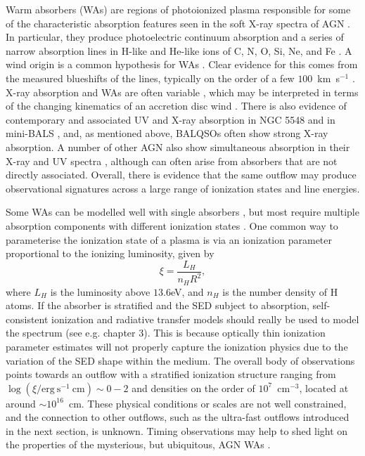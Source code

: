 Warm absorbers (WAs) are regions of photoionized plasma responsible for some
of the characteristic absorption features seen in the 
soft X-ray spectra of AGN \citep{reynolds1995}.
In particular, they produce photoelectric continuum absorption 
\citep[e.g.][]{halpern1984,cappi1996,kriss1996}
and a series of narrow absorption lines in H-like and He-like ions of 
C, N, O, Si, Ne, and Fe \citep{kaastra2000}.
A wind origin is a common hypothesis for WAs 
\citep[e.g.][]{krolikkriss2001}. Clear evidence for this 
comes from the measured blueshifts of the lines, typically on the order of 
a few $100$~km~s$^{-1}$ \citep[e.g.][]{kaastra2000}. X-ray absorption and WAs are often
variable \citep{fabian1994,otani1996}, which may be interpreted in terms of 
the changing kinematics of an accretion disc wind \citep{connolly2014}. 
There is also evidence of contemporary and associated UV and X-ray absorption 
in NGC 5548 \citep{kaastra2014} and in mini-BALS \citep{giustini2011},
and, as mentioned above, BALQSOs often show strong X-ray absorption. 
A number of other AGN also show simultaneous absorption in their X-ray 
and UV spectra \citep[e.g.][]{crenshaw2003,crenshaw2012}, 
although can often arise from absorbers that are not directly associated.
Overall, there is evidence that the same outflow may produce observational signatures  
across a large range of ionization states and line energies. 

Some WAs can be modelled well with single absorbers \citep{kaastra2000}, 
but most require multiple absorption components with different ionization states
\citep[e.g.][]{kriss1996,orr1997,krolikkriss2001,connolly2014}.
One common way to parameterise the ionization state of a plasma is 
via an ionization parameter proportional to the ionizing luminosity, 
given by \citep[e.g.][]{reynolds1995}
\begin{equation}
\xi = \frac{L_{H}}{n_H R^2},
\label{eq:xi}
\end{equation}
where $L_H$ is the luminosity above $13.6$eV, and $n_H$ is the number
density of H atoms. If the absorber is stratified and the SED subject to absorption, 
self-consistent ionization and radiative transfer models
should really be used to model the spectrum (see e.g. chapter 3). This is 
because optically thin ionization parameter estimates will not properly capture 
the ionization physics due to the variation of the SED shape within the medium.
The overall body of observations points towards an outflow with a 
stratified ionization structure ranging from 
$\log (\xi / \mathrm{erg~s^{-1}~cm}) \sim 0-2$ 
and densities on the order of $10^7$~cm$^{-3}$, located at around $\sim10^{16}$~cm. 
These physical conditions or scales are not well constrained, and the connection to 
other outflows, such as the ultra-fast outflows introduced in the next section, 
is unknown. Timing observations may help to shed light on 
the properties of the mysterious, but ubiquitous, 
AGN WAs \citep{silva2015}.

